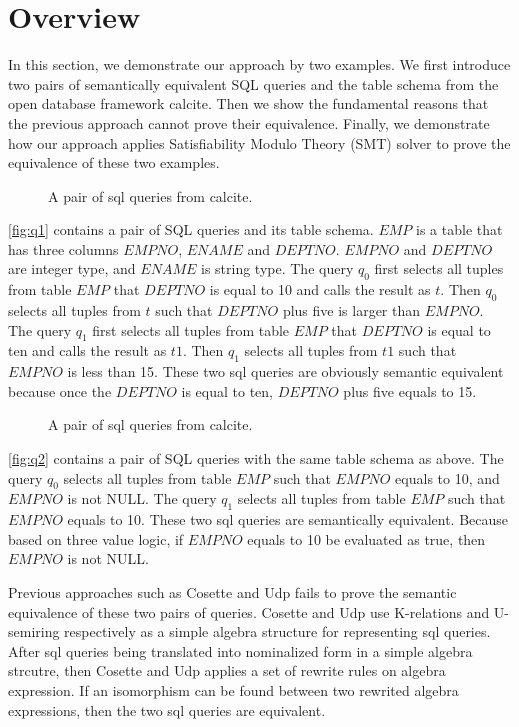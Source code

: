 \section{Overview}\label{sec:overview}
%
In this section, we demonstrate our approach by two examples.
%
We first introduce two pairs of semantically equivalent SQL queries and the table schema from the open database
framework calcite.
%
Then we show the fundamental reasons that the previous approach cannot prove their equivalence.
%
Finally, we demonstrate how our approach applies Satisfiability Modulo Theory (SMT) solver to prove the equivalence 
of these two examples. 
%
\begin{figure}

\caption{%
    A pair of sql queries from calcite.
  }\label{fig:q1}
\end{figure}
%

\autoref{fig:q1} contains a pair of SQL queries and its table schema.
%
$EMP$ is a table that has three columns $EMPNO$, $ENAME$ and $DEPTNO$.
%
$EMPNO$ and $DEPTNO$ are integer type, and $ENAME$ is string type.
%
The query $q_0$ first selects all tuples from table $EMP$ that $DEPTNO$ is equal to
10 and calls the result as $t$.
%
Then $q_0$ selects all tuples from $t$ such that $DEPTNO$ plus five is larger than $EMPNO$.
%
The query $q_1$ first selects all tuples from table $EMP$ that $DEPTNO$ is equal to
ten and calls the result as $t1$.
%
Then $q_1$ selects all tuples from $t1$ such that $EMPNO$ is less than 15.
%
These two sql queries are obviously semantic equivalent 
because once the $DEPTNO$ is equal to ten, $DEPTNO$ plus five equals to 15.
%


%
\begin{figure}

\caption{%
    A pair of sql queries from calcite.
  }\label{fig:q2}
\end{figure}
%
\autoref{fig:q2} contains a pair of SQL queries with the same table schema as above.
%
The query $q_0$ selects all tuples from table $EMP$ such that $EMPNO$ equals to 10, and
$EMPNO$ is not NULL.
%
The query $q_1$ selects all tuples from table $EMP$ such that $EMPNO$ equals to 10.
%
These two sql queries are semantically equivalent. 
%
Because based on three value logic, if $EMPNO$ equals to 10 be evaluated as true, then 
$EMPNO$ is not NULL.  

Previous approaches such as Cosette and Udp fails to prove the semantic
equivalence of these two pairs of queries.
%
Cosette and Udp use K-relations and U-semiring respectively as a simple algebra structure for
representing sql queries.
%
After sql queries being translated into nominalized form in a simple algebra strcutre, then Cosette and
Udp applies a set of rewrite rules on algebra expression.
%
If an isomorphism can be found between two rewrited algebra expressions, then the two sql queries are equivalent.

